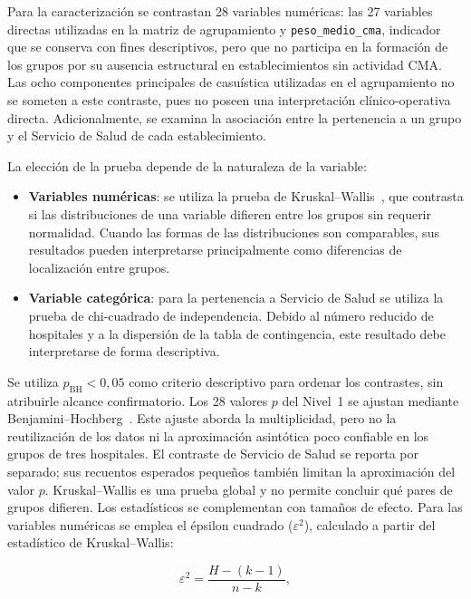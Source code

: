 Para la caracterización se contrastan 28 variables numéricas: las 27 variables
directas utilizadas en la matriz de agrupamiento y \texttt{peso\_medio\_cma},
indicador que se conserva con fines descriptivos, pero que no participa en la
formación de los grupos por su ausencia estructural en establecimientos sin
actividad CMA. Las ocho componentes principales de casuística utilizadas en el
agrupamiento no se someten a este contraste, pues no poseen una interpretación
clínico-operativa directa. Adicionalmente, se examina la asociación entre la
pertenencia a un grupo y el Servicio de Salud de cada establecimiento.

La elección de la prueba depende de la naturaleza de la variable:

\begin{itemize}
  \item \textbf{Variables numéricas}: se utiliza la prueba de
    Kruskal--Wallis~\citep{KruskalWallis1952}, que contrasta si las distribuciones de una variable difieren
    entre los grupos sin requerir normalidad. Cuando las formas de las
    distribuciones son comparables, sus resultados pueden interpretarse
    principalmente como diferencias de localización entre grupos.

\item \textbf{Variable categórica}: para la pertenencia a Servicio de Salud
  se utiliza la prueba de chi-cuadrado de independencia. Debido al número
  reducido de hospitales y a la dispersión de la tabla de contingencia, este
  resultado debe interpretarse de forma descriptiva.
\end{itemize}

Se utiliza $p_{\mathrm{BH}}<0{,}05$ como criterio descriptivo para ordenar
los contrastes, sin atribuirle alcance confirmatorio. Los 28 valores $p$ del
Nivel~1 se ajustan mediante Benjamini--Hochberg~\citep{Benjamini1995}. Este
ajuste aborda la multiplicidad, pero no la reutilización de los datos ni la
aproximación asintótica poco confiable en los grupos de tres hospitales.
El contraste de Servicio de Salud se reporta por separado; sus recuentos
esperados pequeños también limitan la aproximación del valor $p$.
Kruskal--Wallis es una prueba global y no permite concluir qué pares de grupos
difieren. Los estadísticos se complementan con tamaños de efecto. Para las
variables numéricas se emplea el épsilon cuadrado
($\varepsilon^2$), calculado a partir del estadístico de Kruskal--Wallis:

\begin{equation}
  \varepsilon^2 = \frac{H - (k - 1)}{n - k},
  \label{eq:epsilon2}
\end{equation}

